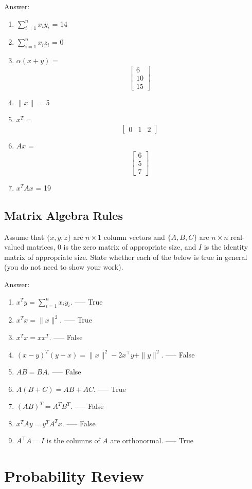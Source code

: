 \documentclass{article}
\def\ans#1{\par\gre{Answer: #1}}
\def\blu#1{{\color{blu}#1}}
\def\gre#1{{\color{gre}#1}}
\def\norm#1{\|#1\|}
\def\enum#1{\begin{enumerate}#1\end{enumerate}}
\begin{document}
\ans{
    \enum{
    \item $\sum_{i=1}^n x_iy_i$ = 14
    \item $\sum_{i=1}^n x_iz_i$ = 0
    \item $\alpha(x+y)$ = \[ \begin{bmatrix} 6 \\ 10 \\ 15 \end{bmatrix} \]
    \item $\norm{x}$ = 5
    \item $x^T$ = \[ \begin{bmatrix} 0 & 1 & 2 \end{bmatrix} \]
    \item $Ax$ = \[ \begin{bmatrix} 6 \\ 5 \\ 7 \end{bmatrix} \]
    \item $x^TAx$ = 19
    }
}


\subsection{Matrix Algebra Rules}

Assume that $\{x,y,z\}$ are $n \times 1$ column vectors and $\{A,B,C\}$ are $n \times n$ real-valued matrices, $0$ is the zero matrix of appropriate size, and $I$ is the identity matrix of appropriate size. \blu{State whether each of the below is true in general} (you do not need to show your work).

\ans{
	\begin{enumerate}
		\item $x^Ty = \sum_{i=1}^n x_iy_i$. ----- True
		\item $x^Tx = \norm{x}^2$. ----- True
		\item $x^Tx = xx^T$. ----- False
		\item $(x-y)^T(y-x) = \norm{x}^2 - 2x^\top y + \norm{y}^2$. ----- False
		\item $AB=BA$. ----- False
		\item $A(B + C) = AB + AC$. ----- True
		\item $(AB)^T = A^TB^T$. ----- False
		\item $x^TAy = y^TA^Tx$. ----- False
		\item $A^\top A = I$ is the columns of $A$ are orthonormal. ----- True
	\end{enumerate}
}


\section{Probability Review}
\end{document}
